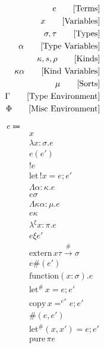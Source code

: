 \documentclass {article}
\begin{document}
\Large

\begin{align*}
e \tag* {[Terms]} \\
x \tag* {[Variables]} \\
\sigma, \tau \tag* {[Types]} \\
\alpha \tag* {[Type Variables]} \\
\kappa, s, \rho \tag* {[Kinds]} \\
\kappa \alpha \tag*{[Kind Variables]} \\
\mu \tag*{[Sorts]} \\
\Gamma \tag* {[Type Environment]} \\
\Phi \tag* {[Misc Environment]}
\end{align*}

\begin{align*}
e \Coloneqq & \\
& x \tag*{[Variable]}\\
& \lambda x : \sigma. e \tag*{[Macro Lambda]}\\
& e(e') \tag*{[Macro Application]}\\
& !e \tag*{[Bang Introduction]} \\
& \text{let} \, !x = e; e' \tag*{[Bang Elimination]} \\ 
& \Lambda \alpha : \kappa. e \tag*{[Type Lambda]} \\
& e \sigma \tag*{[Type Application]} \\
& \Lambda \kappa \alpha : \mu. e \tag*{[Kind Lambda]} \\
& e \kappa \tag*{[Kind Application]} \\
& \lambda^\xi x : \pi. e \tag*{[Evidence Lambda]} \\
& e \xi e' \tag*{[Evidence Application]} \\
& \text{extern} \, x \tau \xrightarrow{\#} \sigma \tag*{[Extern Symbol]} \\
& e\#(e') \tag*{[Function Pointer Application]} \\
& \text{function} (x : \sigma). e \tag*{[Function Literal]} \\
& \text{let}^\# \, x = e; e' \tag*{[Runtime Let]} \\
& \text{copy} \, x =^{e''} e; e' \tag*{[Runtime Copy Let]} \\
& \#(e, e') \tag*{[Runtime Pair Introduction]} \\
& \text{let}^\# (x, x') = e; e' \tag*{[Runtime Pair Elimination]} \\
& \text{pure} \, \pi e \tag*{[Pure Region Transformer]}\\

\end{align*}
\end{document}
